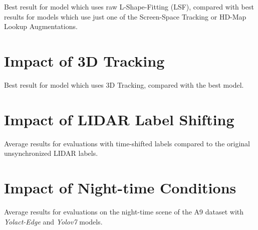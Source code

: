 \begin{table}[htbp]
    
    \caption{Best result for model which uses raw L-Shape-Fitting (LSF), compared with best results for models which use just one of the Screen-Space Tracking or HD-Map Lookup Augmentations.}
    \label{tbl:lsf-results}
\end{table}

\newpage


\section{Impact of 3D Tracking}
\label{sec:impacttracking}

\begin{table}[htbp]
    
    \caption{Best result for model which uses 3D Tracking, compared with the best model.}
    \label{tbl:track-3d-results}
\end{table}

\section{Impact of LIDAR Label Shifting}
\label{sec:impactlidar}

\begin{table}[htbp]
    
    \caption{Average results for evaluations with time-shifted labels compared to the original unsynchronized LIDAR labels.}
    \label{tbl:label-shift-results}
\end{table}

\newpage


\section{Impact of Night-time Conditions}
\label{sec:weather}

\begin{table}[htbp]
    
    \caption{Average results for evaluations on the night-time scene of the A9 dataset with \textit{Yolact-Edge} and \textit{Yolov7} models.}
    \label{tbl:nighttime-results}
\end{table}

\newpage


